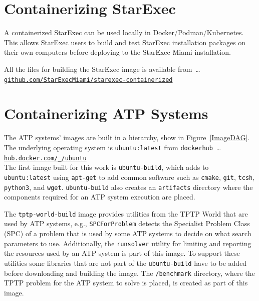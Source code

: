 \documentclass{easychair}
\begin{document}
\section{Containerizing StarExec}
\label{ContainerizingStarExec}

A containerized StarExec can be used locally in Docker/Podman/Kubernetes. 
This allows StarExec users to build and test StarExec installation packages on their own 
computers before deploying to the StarExec Miami installation.

All the files for building the StarExec image is available from~\ldots \\
\hspace*{1cm}\href{https://github.com/StarExecMiami/starexec-containerized}{\tt github.com/StarExecMiami/starexec-containerized}\\
\section{Containerizing ATP Systems}
\label{ContainerizingATPSystems}

The ATP systems' images are built in a hierarchy, show in Figure~\ref{ImageDAG}.
The underlying operating system is {\tt ubuntu:latest} from {\tt dockerhub}~\ldots\\
\hspace*{1cm}\href{https://hub.docker.com/_/ubuntu}{\tt hub.docker.com/\_/ubuntu} \\
The first image built for this work is {\tt ubuntu-build}, which adds to {\tt ubuntu:latest} 
using {\tt apt-get} to add common software such as {\tt cmake}, {\tt git}, {\tt tcsh}, 
{\tt python3}, and {\tt wget}.
{\tt ubuntu-build} also creates an {\tt artifacts} directory where the components required for 
an ATP system execution are placed.

The {\tt tptp-world-build} image provides utilities from the TPTP World \cite{Sut24} that 
are used by ATP systems, e.g., {\tt SPCForProblem} detects the Specialist Problem Class (SPC) 
\cite{SS01} of a problem that is used by some ATP systems to decide on what search parameters 
to use.
Additionally, the {\tt runsolver} utility for limiting and reporting the resources
used by an ATP system is part of this image.
To support these utilities some libraries that are not part of the {\tt ubuntu-build} have
to be added before downloading and building the image.
The {\tt /benchmark} directory, where the TPTP problem for the ATP system to solve is placed, is
created as part of this image.
\end{document}
